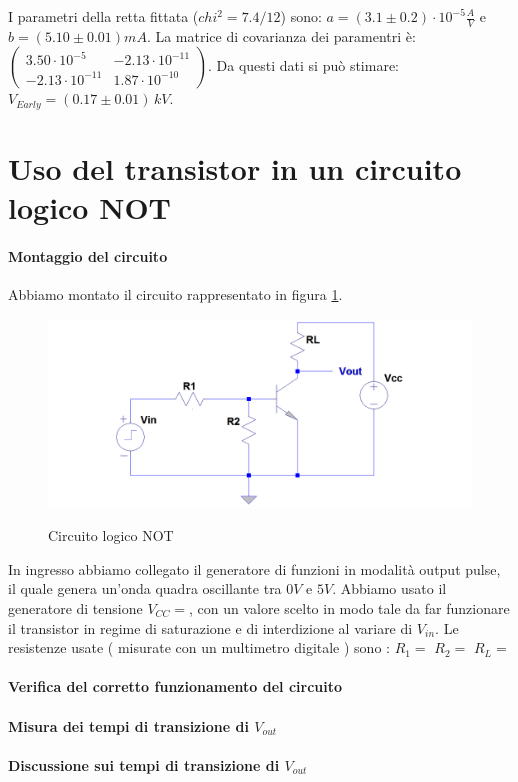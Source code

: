 \documentclass[10pt,a4paper]{article}
\begin{document}
I parametri della retta fittata ($chi^2 = 7.4/12$)  sono: $a = (3.1 \pm 0.2) \cdot 10^{-5} \frac{A}{V}$ e $b = (5.10 \pm 0.01) mA$. La matrice di covarianza dei paramentri è: $\left( 
\begin{array}{cc}
3.50\cdot 10^{-5} & -2.13\cdot 10^{-11} \\ 
-2.13\cdot 10^{-11} & 1.87 \cdot 10^{-10}
\end{array} \right)$.
Da questi dati si può stimare: $V_{Early} = (0.17 \pm 0.01) \, kV$.


 
\section{Uso del transistor in un circuito logico NOT }
\paragraph{Montaggio del circuito}
Abbiamo montato il circuito rappresentato in  figura \ref{circuito2}.
\begin{figure}[!htb]
  \centering
  \includegraphics[scale=0.4]{circuito2} \label{circuito2}
\caption{Circuito logico NOT}
\label{circuito2}
\end{figure} 

In ingresso abbiamo collegato  il generatore di funzioni in modalità output pulse, il quale genera un’onda quadra oscillante tra $0 V$ e $5 V$. Abbiamo usato  il generatore di tensione $V_{CC}=$, con un valore scelto in modo tale da far funzionare il transistor  in regime di saturazione e di interdizione al variare di $V_{in}$. Le resistenze usate ( misurate con un multimetro digitale ) sono : $R_1=$ $R_2=$ $R_L=$


\paragraph{Verifica del corretto funzionamento del circuito}

\paragraph{Misura dei tempi di transizione di $V_{out}$ }

\paragraph{Discussione sui tempi di transizione di $ V_{out}$}
\end{document}
